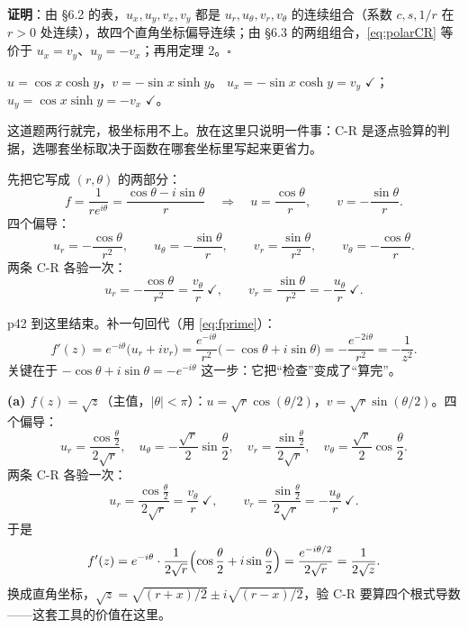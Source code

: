 \documentclass[11pt]{ctexart}
\newcommand{\chk}{\ensuremath{\checkmark}}
\let\origsubhdr\subhdr
\renewcommand{\subhdr}[1]{\par\needspace{4\baselineskip}\origsubhdr{#1}}
\begin{document}
\textbf{证明}：由 §6.2 的表，$u_x,u_y,v_x,v_y$ 都是 $u_r,u_\theta,v_r,v_\theta$ 的连续组合（系数 $c,s,1/r$ 在 $r>0$ 处连续），故四个直角坐标偏导连续；由 §6.3 的两组组合，\eqref{eq:polarCR} 等价于 $u_x=v_y$、$u_y=-v_x$；再用定理 2。$\square$






$u=\cos x\cosh y$，$v=-\sin x\sinh y$。
$u_x=-\sin x\cosh y=v_y$ \chk；$u_y=\cos x\sinh y=-v_x$ \chk。

这道题两行就完，极坐标用不上。放在这里只说明一件事：C-R 是逐点验算的判据，选哪套坐标取决于函数在哪套坐标里写起来更省力。



先把它写成 $(r,\theta)$ 的两部分：
\[ f=\frac{1}{re^{i\theta}}=\frac{\cos\theta-i\sin\theta}{r}
\quad\Longrightarrow\quad u=\frac{\cos\theta}{r},\qquad v=-\frac{\sin\theta}{r}. \]
四个偏导：
\[ u_r=-\frac{\cos\theta}{r^2},\qquad u_\theta=-\frac{\sin\theta}{r},\qquad
v_r=\frac{\sin\theta}{r^2},\qquad v_\theta=-\frac{\cos\theta}{r}. \]
两条 C-R 各验一次：
\[ u_r=-\frac{\cos\theta}{r^2}=\frac{v_\theta}{r}\ \chk,\qquad
v_r=\frac{\sin\theta}{r^2}=-\frac{u_\theta}{r}\ \chk . \]

p42 到这里结束。补一句回代（用 \eqref{eq:fprime}）：
\[ f'(z)=e^{-i\theta}\bigl(u_r+iv_r\bigr)=\frac{e^{-i\theta}}{r^2}\bigl(-\cos\theta+i\sin\theta\bigr)
=-\frac{e^{-2i\theta}}{r^2}=-\frac{1}{z^2}. \]
关键在于 $-\cos\theta+i\sin\theta=-e^{-i\theta}$ 这一步：它把“检查”变成了“算完”。


\textbf{(a) $f(z)=\sqrt z$}（主值，$|\theta|<\pi$）：$u=\sqrt r\cos(\theta/2)$，$v=\sqrt r\sin(\theta/2)$。四个偏导：
\[ u_r=\frac{\cos\frac\theta2}{2\sqrt r},\quad
u_\theta=-\frac{\sqrt r}{2}\sin\frac\theta2,\quad
v_r=\frac{\sin\frac\theta2}{2\sqrt r},\quad
v_\theta=\frac{\sqrt r}{2}\cos\frac\theta2 . \]
两条 C-R 各验一次：
\[ u_r=\frac{\cos\frac\theta2}{2\sqrt r}=\frac{v_\theta}{r}\ \chk,\qquad
v_r=\frac{\sin\frac\theta2}{2\sqrt r}=-\frac{u_\theta}{r}\ \chk . \]
于是
\[ f'(z)=e^{-i\theta}\cdot\frac{1}{2\sqrt r}\Bigl(\cos\frac\theta2+i\sin\frac\theta2\Bigr)
=\frac{e^{-i\theta/2}}{2\sqrt r}=\frac{1}{2\sqrt z}. \]
换成直角坐标，$\sqrt z=\sqrt{(r+x)/2}\pm i\sqrt{(r-x)/2}$，验 C-R 要算四个根式导数——这套工具的价值在这里。
\end{document}
